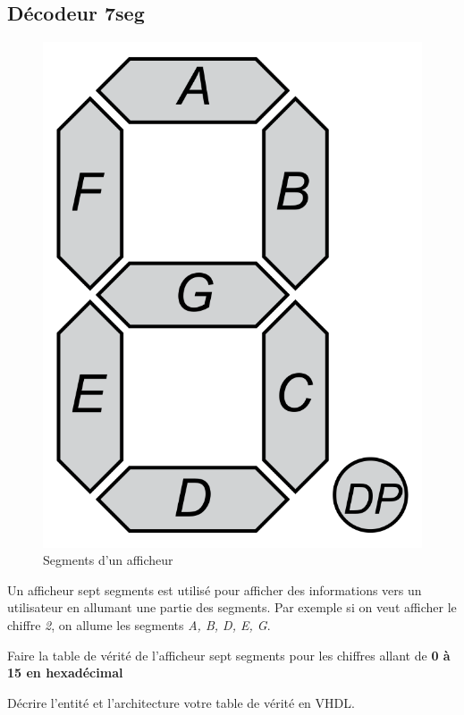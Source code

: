 \subsection{Décodeur 7seg}
\begin{figure}[ht]
    \centering
    \includegraphics[scale = 0.1]{img/SevenSegDisplay.png}
    \caption{Segments d'un afficheur}
\end{figure}

Un afficheur sept segments est utilisé pour afficher des informations vers un utilisateur en allumant une partie des segments. Par exemple si on veut afficher le chiffre \textit{2}, on allume les segments \textit{A, B, D, E, G}.

\medskip

Faire la table de vérité de l'afficheur sept segments pour les chiffres allant de \textbf{0 à 15 en hexadécimal}

\medskip

Décrire l'entité et l'architecture votre table de vérité en VHDL.

